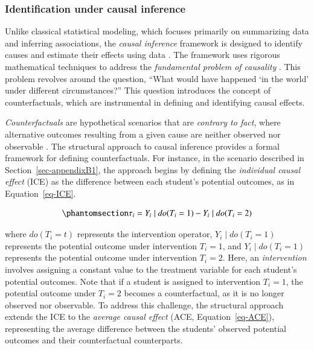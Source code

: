 \documentclass[
  authoryear,
  review,
  1p]{elsarticle}
\begin{document}
\subsubsection{Identification under causal
inference}\label{sec-appendixB2}

Unlike classical statistical modeling, which focuses primarily on
summarizing data and inferring associations, the \emph{causal inference}
framework is designed to identify causes and estimate their effects
using data \citep{Shaughnessy_et_al_2010, Neal_2020}. The framework uses
rigorous mathematical techniques to address the \emph{fundamental
problem of causality}
\citep{Pearl_2009, Pearl_et_al_2016, Morgan_et_al_2014}. This problem
revolves around the question, ``What would have happened `in the world'
under different circumstances?'' This question introduces the concept of
counterfactuals, which are instrumental in defining and identifying
causal effects.

\emph{Counterfactuals} are hypothetical scenarios that are
\emph{contrary to fact}, where alternative outcomes resulting from a
given cause are neither observed nor observable
\citep{Neal_2020, Counterfactual_2024}. The structural approach to
causal inference \citep{Pearl_2009, Pearl_et_al_2016} provides a formal
framework for defining counterfactuals. For instance, in the scenario
described in Section~\ref{sec-appendixB1}, the approach begins by
defining the \emph{individual causal effect} (ICE) as the difference
between each student's potential outcomes, as in Equation~\ref{eq-ICE}.

\begin{equation}\phantomsection\label{eq-ICE}{
\tau_{i} = Y_{i} \mid do(T_{i}=1) - Y_{i} \mid do(T_{i}=2)
}\end{equation}

where \(do(T_{i}=t)\) represents the intervention operator,
\(Y_{i} \mid do(T_{i}=1)\) represents the potential outcome under
intervention \(T_{i}=1\), and \(Y_{i} \mid do(T_{i}=1)\) represents the
potential outcome under intervention \(T_{i}=2\). Here, an
\emph{intervention} involves assigning a constant value to the treatment
variable for each student's potential outcomes. Note that if a student
is assigned to intervention \(T_{i}=1\), the potential outcome under
\(T_{i}=2\) becomes a counterfactual, as it is no longer observed nor
observable. To address this challenge, the structural approach extends
the ICE to the \emph{average causal effect} (ACE,
Equation~\ref{eq-ACE}), representing the average difference between the
students' observed potential outcomes and their counterfactual
counterparts.
\end{document}
